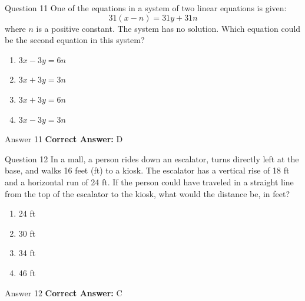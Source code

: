 \documentclass{beamer}
\begin{document}
\begin{frame}{Question 11}
\small
One of the equations in a system of two linear equations is given:  
\[
31(x - n) = 31y + 31n
\]  
where \(n\) is a positive constant.  
The system has no solution. Which equation could be the second equation in this system?
\vspace{0.35cm}
\begin{enumerate}
    \item[A.] $3x - 3y = 6n$
    \item[B.] $3x + 3y = 3n$
    \item[C.] $3x + 3y = 6n$
    \item[D.] $3x - 3y = 3n$
\end{enumerate}
\end{frame}
\begin{frame}{Answer 11}
\small
\textbf{Correct Answer:} D
\end{frame}

\begin{frame}{Question 12}
\small
In a mall, a person rides down an escalator, turns directly left at the base, and walks 16 feet (ft) to a kiosk.  
The escalator has a vertical rise of 18 ft and a horizontal run of 24 ft.  
If the person could have traveled in a straight line from the top of the escalator to the kiosk, what would the distance be, in feet?
\vspace{0.35cm}
\begin{enumerate}
    \item[A.] 24 ft
    \item[B.] 30 ft
    \item[C.] 34 ft
    \item[D.] 46 ft
\end{enumerate}
\end{frame}
\begin{frame}{Answer 12}
\small
\textbf{Correct Answer:} C
\end{frame}
\end{document}
